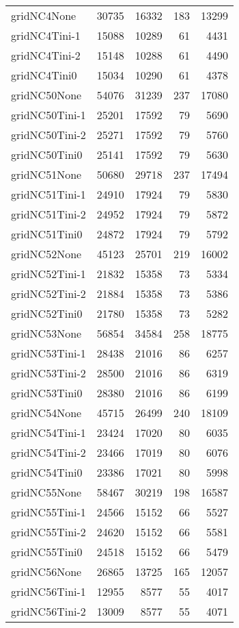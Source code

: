 \begin{longtable}{lrrrr}
gridNC4None & 30735 & 16332 & 183 & 13299 \\
gridNC4Tini-1 & 15088 & 10289 & 61 & 4431 \\
gridNC4Tini-2 & 15148 & 10288 & 61 & 4490 \\
gridNC4Tini0 & 15034 & 10290 & 61 & 4378 \\
gridNC50None & 54076 & 31239 & 237 & 17080 \\
gridNC50Tini-1 & 25201 & 17592 & 79 & 5690 \\
gridNC50Tini-2 & 25271 & 17592 & 79 & 5760 \\
gridNC50Tini0 & 25141 & 17592 & 79 & 5630 \\
gridNC51None & 50680 & 29718 & 237 & 17494 \\
gridNC51Tini-1 & 24910 & 17924 & 79 & 5830 \\
gridNC51Tini-2 & 24952 & 17924 & 79 & 5872 \\
gridNC51Tini0 & 24872 & 17924 & 79 & 5792 \\
gridNC52None & 45123 & 25701 & 219 & 16002 \\
gridNC52Tini-1 & 21832 & 15358 & 73 & 5334 \\
gridNC52Tini-2 & 21884 & 15358 & 73 & 5386 \\
gridNC52Tini0 & 21780 & 15358 & 73 & 5282 \\
gridNC53None & 56854 & 34584 & 258 & 18775 \\
gridNC53Tini-1 & 28438 & 21016 & 86 & 6257 \\
gridNC53Tini-2 & 28500 & 21016 & 86 & 6319 \\
gridNC53Tini0 & 28380 & 21016 & 86 & 6199 \\
gridNC54None & 45715 & 26499 & 240 & 18109 \\
gridNC54Tini-1 & 23424 & 17020 & 80 & 6035 \\
gridNC54Tini-2 & 23466 & 17019 & 80 & 6076 \\
gridNC54Tini0 & 23386 & 17021 & 80 & 5998 \\
gridNC55None & 58467 & 30219 & 198 & 16587 \\
gridNC55Tini-1 & 24566 & 15152 & 66 & 5527 \\
gridNC55Tini-2 & 24620 & 15152 & 66 & 5581 \\
gridNC55Tini0 & 24518 & 15152 & 66 & 5479 \\
gridNC56None & 26865 & 13725 & 165 & 12057 \\
gridNC56Tini-1 & 12955 & 8577 & 55 & 4017 \\
gridNC56Tini-2 & 13009 & 8577 & 55 & 4071 \\

\end{longtable}
